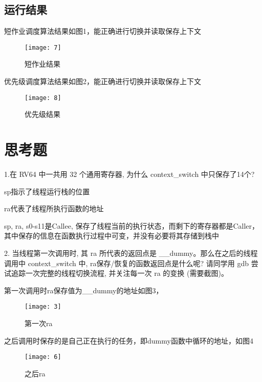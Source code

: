 \documentclass{source/Report}
\begin{document}
\subsection{运行结果}

短作业调度算法结果如图1，能正确进行切换并读取保存上下文

\begin{figure}[p]
    \centering
    \texttt{[image: 7]}
    \caption{短作业结果}
\end{figure}

优先级调度算法结果如图2，能正确进行切换并读取保存上下文

\begin{figure}[p]
    \centering
    \texttt{[image: 8]}
    \caption{优先级结果}
\end{figure}


\section{思考题}

1.在 RV64 中一共用 32 个通用寄存器, 为什么 context\_switch 中只保存了14个?

sp指示了线程运行栈的位置

ra代表了线程所执行函数的地址

sp, ra, s0-s11是Callee, 保存了线程当前的执行状态，而剩下的寄存器都是Caller，其中保存的信息在函数执行过程中可变，并没有必要将其存储到栈中

2. 当线程第一次调用时, 其 ra 所代表的返回点是 \_\_dummy。那么在之后的线程调用中 context\_switch 中, ra保存/恢复的函数返回点是什么呢? 请同学用 gdb 尝试追踪一次完整的线程切换流程, 并关注每一次 ra 的变换 (需要截图)。

第一次调用时ra保存值为\_\_dummy的地址如图3，

\begin{figure}[p]
    \centering
    \texttt{[image: 3]}
    \caption{第一次ra}
\end{figure}

之后调用时保存的是自己正在执行的任务，即dummy函数中循环的地址，如图4

\begin{figure}[p]
    \centering
    \texttt{[image: 6]}
    \caption{之后ra}
\end{figure}
\end{document}
